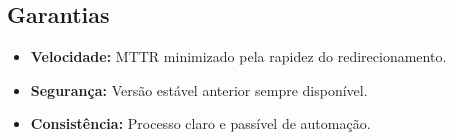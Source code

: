 \subsection{Garantias}
\label{subsec:rollback-garantias}
\begin{itemize}
    \item \textbf{Velocidade:} MTTR minimizado pela rapidez do redirecionamento.
    \item \textbf{Segurança:} Versão estável anterior sempre disponível.
    \item \textbf{Consistência:} Processo claro e passível de automação.
\end{itemize}

